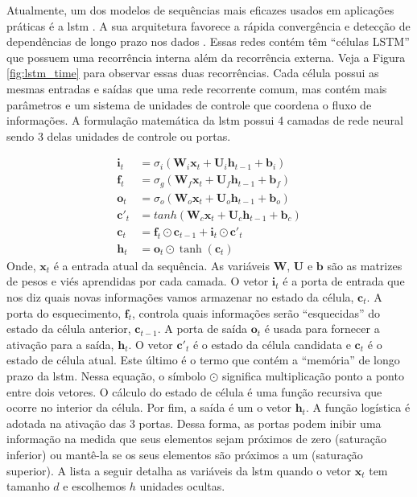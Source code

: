 Atualmente, um dos modelos de sequências mais eficazes usados em aplicações práticas é a \gls{lstm} \cite{lstm}. A sua arquitetura favorece a rápida convergência e detecção de dependências de longo prazo nos dados \cite{geron2017hands}.
Essas redes contém  têm ``células LSTM'' que possuem uma recorrência interna além da recorrência externa. Veja a Figura \ref{fig:lstm_time} para observar essas duas recorrências. Cada célula possui as mesmas entradas e saídas que uma rede recorrente comum, mas contém mais parâmetros e um sistema de unidades de controle que coordena o fluxo de informações.  A formulação matemática da \acrshort{lstm} possui 4 camadas de rede neural sendo 3 delas unidades de controle ou portas. 

\begin{equation}
\label{eq:lstm}
\begin{aligned}
\textbf{i}_t &= \sigma_{i}(\textbf{W}_i\textbf{x}_t + \textbf{U}_i\textbf{h}_{t-1} + \textbf{b}_i) \\
\textbf{f}_t &= \sigma_{g}(\textbf{W}_f\textbf{x}_t + \textbf{U}_f\textbf{h}_{t-1} + \textbf{b}_f) \\
\textbf{o}_t &= \sigma_{o}(\textbf{W}_o\textbf{x}_t + \textbf{U}_o\textbf{h}_{t-1} + \textbf{b}_o) \\   
\textbf{c}'_t &= tanh(\textbf{W}_c\textbf{x}_t + \textbf{U}_c\textbf{h}_{t-1} + \textbf{b}_c) \\
\textbf{c}_t &= \textbf{f}_t \odot \textbf{c}_{t-1} + \textbf{i}_t \odot \textbf{c}'_t \\
\textbf{h}_t & = \textbf{o}_t \odot \tanh(\textbf{c}_t)  
\end{aligned}
\end{equation}
Onde, $\textbf{x}_t$ é a entrada atual da sequência. As variáveis $\textbf{W}$, $\textbf{U}$ e $\textbf{b}$  são as matrizes de pesos e viés aprendidas por cada camada.  O vetor $\textbf{i}_{t}$ é a porta de entrada que nos diz quais novas informações vamos armazenar no estado da célula, $\textbf{c}_{t}$. 
A porta do esquecimento, $\textbf{f}_{t}$, controla quais informações serão ``esquecidas'' do estado da célula anterior, $\textbf{c}_{t-1}$. A porta de saída $\textbf{o}_{t}$ é usada para fornecer a ativação para a saída, $\textbf{h}_{t}$. O vetor $\textbf{c}'_{t}$ é o estado da célula candidata e $\textbf{c}_{t}$ é o estado de célula atual.  Este último é o termo que contém a ``memória'' de longo prazo da \acrshort{lstm}. Nessa equação, o símbolo $\odot$ significa multiplicação ponto a ponto entre dois vetores. O cálculo do estado de célula é uma função recursiva que ocorre no interior da célula. Por fim, a saída é um o vetor $\textbf{h}_{t}$.
A função logística é adotada na ativação das 3 portas.  Dessa forma, as portas podem inibir uma informação na medida que seus elementos sejam próximos de zero (saturação inferior) ou mantê-la se os seus elementos são próximos a um (saturação superior). A lista a seguir detalha as variáveis da \acrshort{lstm} quando o vetor $\textbf{x}_t$ tem tamanho $d$ e escolhemos $h$ unidades ocultas.    


